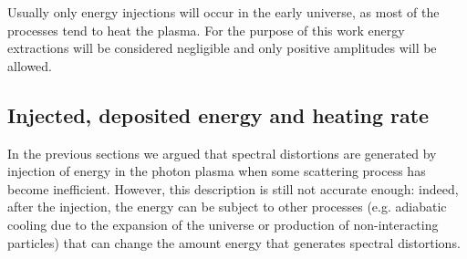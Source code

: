 Usually only energy injections will occur in the early universe, as most of the processes tend to heat the plasma. For the purpose of this work energy extractions will be considered negligible and only positive amplitudes will be allowed.  
\subsection{Injected, deposited energy and heating rate}\label{sec:SD_injected_deposited_energy}
In the previous sections we argued that spectral distortions are generated by injection of energy in the photon plasma when some scattering process has become inefficient. However, this description is still not accurate enough: indeed, after the injection, the energy can be subject to other processes (e.g. adiabatic cooling due to the expansion of the universe or production of non-interacting particles) that can change the amount energy that generates spectral distortions. 

